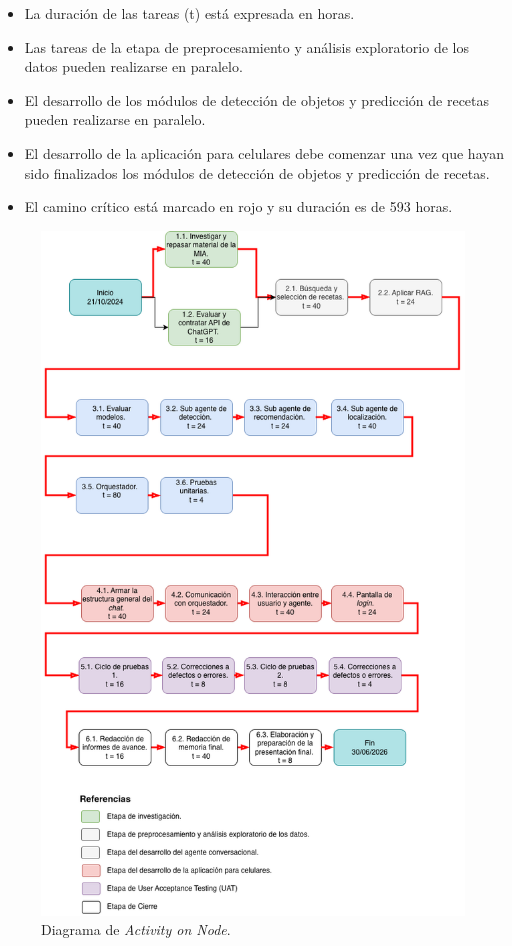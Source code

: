 \documentclass[
11pt, %
]{charter}
\begin{document}
\begin{itemize}
\item La duración de las tareas (t) está expresada en horas.
\item Las tareas de la etapa de preprocesamiento y análisis exploratorio de los datos pueden realizarse en paralelo.
\item El desarrollo de los módulos de detección de objetos y predicción de recetas pueden realizarse en paralelo.
\item El desarrollo de la aplicación para celulares debe comenzar una vez que hayan sido finalizados los módulos de detección de objetos y predicción de recetas.
\item El camino crítico está marcado en rojo y su duración es de 593 horas.
\end{itemize}


\begin{figure}[htpb]
\centering 
\includegraphics[width=.8\textwidth]{./Figuras/AoN-MIA.png}
\caption{Diagrama de \textit{Activity on Node}.}
\label{fig:AoN}
\end{figure}
\end{document}
